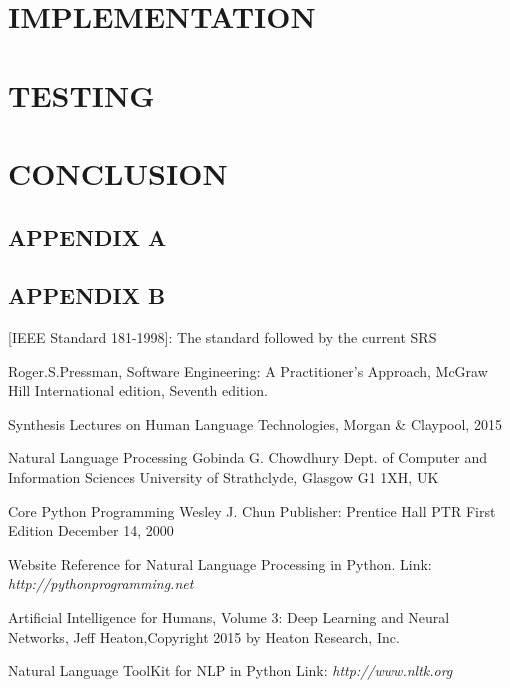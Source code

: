 \documentclass[11pt]{report}
\begin{document}
\chapter{IMPLEMENTATION}


\chapter{TESTING}


\chapter{CONCLUSION}


\newpage
\section*{APPENDIX A}


\newpage

\newpage



\newpage
\section*{APPENDIX B}


\renewcommand\bibname{References}
\begin{thebibliography}{9}
[IEEE Standard 181-1998]: The standard followed by the current SRS
 
Roger.S.Pressman, Software Engineering: A Practitioner’s Approach, McGraw Hill International edition, Seventh edition.
 
Synthesis Lectures on Human Language Technologies, Morgan \& Claypool, 2015

Natural Language Processing Gobinda G. Chowdhury Dept. of Computer and Information Sciences University of Strathclyde, Glasgow G1 1XH, UK

Core Python Programming Wesley J. Chun Publisher: Prentice Hall PTR First Edition December 14, 2000

Website Reference for Natural Language Processing in Python.
Link: \textit{http://pythonprogramming.net}

Artificial Intelligence for Humans, Volume 3: Deep Learning and Neural Networks, Jeff Heaton,Copyright    2015 by Heaton Research, Inc.

Natural Language ToolKit for NLP in Python
Link: \textit{http://www.nltk.org}

\end{thebibliography}
\end{document}
